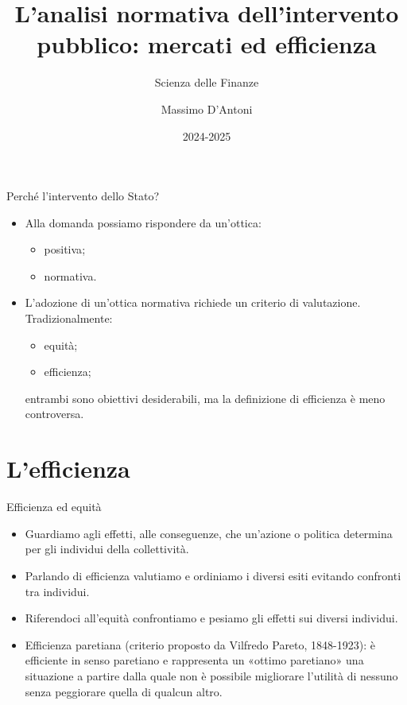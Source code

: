 \documentclass[aspectratio=64,12pt]{beamer}
\institute{Università di Siena}
\author{Massimo D'Antoni}
\date{2024-2025}
\title{L'analisi normativa dell'intervento pubblico: mercati ed efficienza}
\subtitle{Scienza delle Finanze}
\begin{document}
\maketitle

\begin{frame}{Perché l'intervento dello Stato?}
\begin{itemize}
\item Alla domanda possiamo rispondere da un’ottica:
\begin{itemize}
\item \alert{positiva};
\item \alert{normativa}.
\end{itemize}
\item L’adozione di un’ottica normativa richiede un criterio di valutazione. Tradizionalmente: 
\begin{itemize}
\item \alert{equità};
\item \alert{efficienza};
\end{itemize}
entrambi sono obiettivi desiderabili, ma la definizione di efficienza è meno controversa.
\end{itemize}
\end{frame}

\section{L'efficienza}


\begin{frame}{Efficienza ed equità}
\begin{itemize}
\item Guardiamo agli \alert{effetti}, alle \alert{conseguenze}, che un'azione o politica determina per gli individui della collettività.
\item Parlando di \alert{efficienza} valutiamo e ordiniamo i diversi esiti evitando confronti tra individui. \item Riferendoci all'\alert{equità} confrontiamo e pesiamo gli effetti sui diversi individui.
\item \alert{Efficienza paretiana} (criterio proposto da Vilfredo Pareto, 1848-1923): è efficiente in senso paretiano e rappresenta un «ottimo paretiano» una situazione a partire dalla quale non è possibile migliorare l’utilità di nessuno senza peggiorare quella di qualcun altro.
\end{itemize}
\end{frame}
\end{document}
